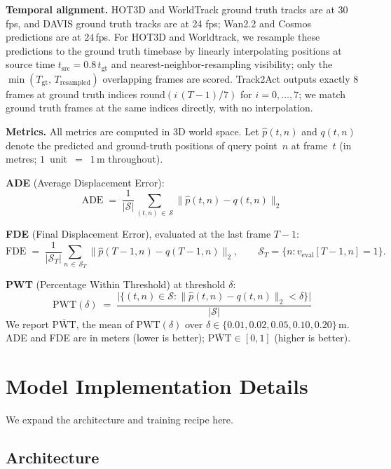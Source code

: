 \noindent\textbf{Temporal alignment.}
HOT3D and WorldTrack ground truth tracks are at $30$\,fps, and DAVIS ground truth tracks are at 24 fps; Wan2.2 and Cosmos predictions are at $24$\,fps.
For HOT3D and Worldtrack, we resample these predictions to the ground truth
timebase by linearly interpolating positions at source time
$t_\text{src} = 0.8\,t_\text{gt}$ and nearest-neighbor-resampling
visibility; only the $\min(T_\text{gt},\,T_\text{resampled})$ overlapping
frames are scored. Track2Act outputs exactly $8$ frames at ground truth indices
$\mathrm{round}(i\,(T-1)/7)$ for $i=0,\ldots,7$; we match ground truth frames at the
same indices directly, with no interpolation.

\noindent\textbf{Metrics.}
All metrics are computed in 3D world space. Let $\hat{p}(t,n)$ and $q(t,n)$
denote the predicted and ground-truth positions of query point~$n$ at
frame~$t$ (in metres; $1$~unit~$=$~$1$\,m throughout).

\textbf{ADE} (Average Displacement Error):
\[
  \mathrm{ADE} \;=\; \frac{1}{|\mathcal{S}|}
    \sum_{(t,n)\,\in\,\mathcal{S}} \|\hat{p}(t,n) - q(t,n)\|_2
\]

\textbf{FDE} (Final Displacement Error), evaluated at the last frame $T-1$:
\[
  \mathrm{FDE} \;=\; \frac{1}{|\mathcal{S}_T|}
    \sum_{n\,\in\,\mathcal{S}_T} \|\hat{p}(T-1,n) - q(T-1,n)\|_2,
  \qquad \mathcal{S}_T = \{n : v_\text{eval}[T-1,n]=1\}.
\]

\textbf{PWT} (Percentage Within Threshold) at threshold $\delta$:
\[
  \mathrm{PWT}(\delta) \;=\;
    \frac{\bigl|\{(t,n)\in\mathcal{S} :
      \|\hat{p}(t,n)-q(t,n)\|_2 < \delta\}\bigr|}{|\mathcal{S}|}
\]
We report $\overline{\mathrm{PWT}}$, the mean of $\mathrm{PWT}(\delta)$ over
$\delta \in \{0.01, 0.02, 0.05, 0.10, 0.20\}$\,m. ADE and FDE are in meters
(lower is better); $\overline{\mathrm{PWT}}\in[0,1]$ (higher is better).




\section{Model Implementation Details}
\label{appsec:model_details}

We expand the architecture and training recipe here.

\subsection{Architecture}
\label{appsec:model_arch}

